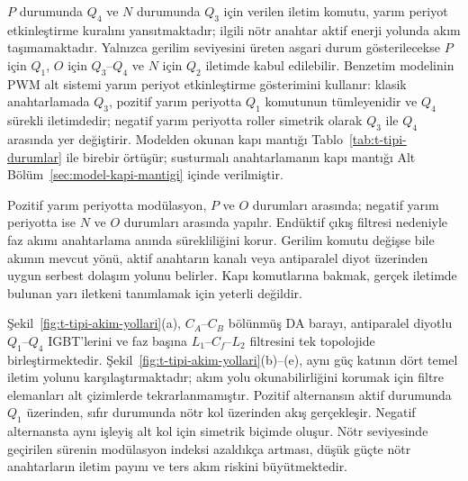 $P$ durumunda $Q_4$ ve $N$ durumunda $Q_3$ için verilen iletim komutu, yarım periyot etkinleştirme kuralını yansıtmaktadır; ilgili nötr anahtar aktif enerji yolunda akım taşımamaktadır. Yalnızca gerilim seviyesini üreten asgari durum gösterilecekse $P$ için $Q_1$, $O$ için $Q_3$--$Q_4$ ve $N$ için $Q_2$ iletimde kabul edilebilir. Benzetim modelinin PWM alt sistemi yarım periyot etkinleştirme gösterimini kullanır: klasik anahtarlamada $Q_3$, pozitif yarım periyotta $Q_1$ komutunun tümleyenidir ve $Q_4$ sürekli iletimdedir; negatif yarım periyotta roller simetrik olarak $Q_3$ ile $Q_4$ arasında yer değiştirir. Modelden okunan kapı mantığı Tablo~\ref{tab:t-tipi-durumlar} ile birebir örtüşür; susturmalı anahtarlamanın kapı mantığı Alt Bölüm~\ref{sec:model-kapi-mantigi} içinde verilmiştir.

Pozitif yarım periyotta modülasyon, $P$ ve $O$ durumları arasında; negatif yarım periyotta ise $N$ ve $O$ durumları arasında yapılır. Endüktif çıkış filtresi nedeniyle faz akımı anahtarlama anında sürekliliğini korur. Gerilim komutu değişse bile akımın mevcut yönü, aktif anahtarın kanalı veya antiparalel diyot üzerinden uygun serbest dolaşım yolunu belirler. Kapı komutlarına bakmak, gerçek iletimde bulunan yarı iletkeni tanımlamak için yeterli değildir.

Şekil~\ref{fig:t-tipi-akim-yollari}(a), $C_A$--$C_B$ bölünmüş DA barayı, antiparalel diyotlu $Q_1$--$Q_4$ IGBT'lerini ve faz başına $L_1$--$C_f$--$L_2$ filtresini tek topolojide birleştirmektedir. Şekil~\ref{fig:t-tipi-akim-yollari}(b)--(e), aynı güç katının dört temel iletim yolunu karşılaştırmaktadır; akım yolu okunabilirliğini korumak için filtre elemanları alt çizimlerde tekrarlanmamıştır. Pozitif alternansın aktif durumunda $Q_1$ üzerinden, sıfır durumunda nötr kol üzerinden akış gerçekleşir. Negatif alternansta aynı işleyiş alt kol için simetrik biçimde oluşur. Nötr seviyesinde geçirilen sürenin modülasyon indeksi azaldıkça artması, düşük güçte nötr anahtarların iletim payını ve ters akım riskini büyütmektedir.


